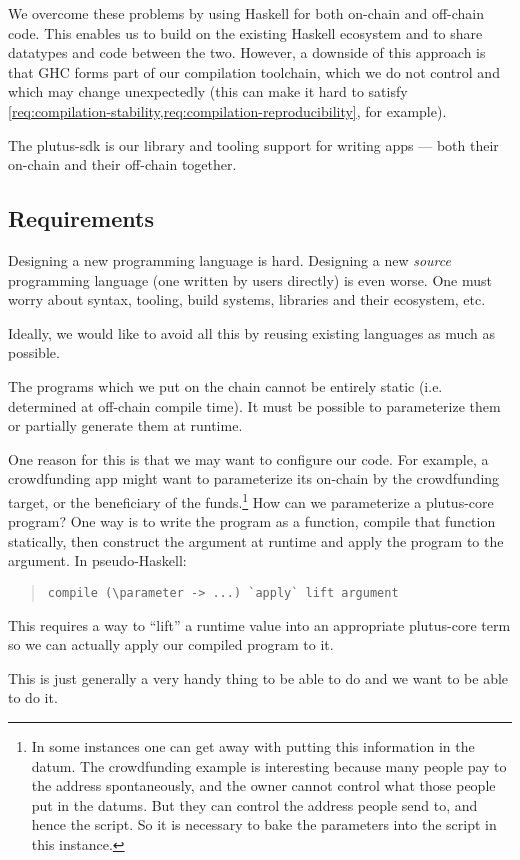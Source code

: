 We overcome these problems by using Haskell for both \gls{on-chain} and \gls{off-chain} code.
This enables us to build on the existing Haskell ecosystem and to share datatypes and code between the two.
However, a downside of this approach is that GHC forms part of our compilation toolchain, which we do not control and which may change unexpectedly (this can make it hard to satisfy \cref{req:compilation-stability,req:compilation-reproducibility}, for example).

The \gls{plutus-sdk} is our library and tooling support for writing \glspl{app} --- both their \gls{on-chain} and their \gls{off-chain} together.

\subsection{Requirements}
\begin{requirement}[Conservatism]
\label{req:source-lang-conservatism}
Designing a new programming language is hard.
Designing a new \emph{source} programming language (one written by users directly) is even worse.
One must worry about syntax, tooling, build systems, libraries and their ecosystem, etc.

Ideally, we would like to avoid all this by reusing existing languages as much as possible.
\end{requirement}

\begin{requirement}
\label{req:runtime-args}
The programs which we put on the chain cannot be entirely static (i.e. determined at \gls{off-chain} compile time).
It must be possible to parameterize them or partially generate them at runtime.

One reason for this is that we may want to configure our code.
For example, a crowdfunding \gls{app} might want to parameterize its \gls{on-chain} by the crowdfunding target, or the beneficiary of the funds.\footnote{
In some instances one can get away with putting this information in the \gls{datum}.
The crowdfunding example is interesting because many people pay to the \gls{address} spontaneously, and the owner cannot control what those people put in the \glspl{datum}.
But they can control the \gls{address} people send to, and hence the \gls{script}.
So it is necessary to bake the parameters into the \gls{script} in this instance.
}
How can we parameterize a \gls{plutus-core} program?
One way is to write the program as a function, compile that function statically, then construct the argument at runtime and apply the program to the argument.
In pseudo-Haskell:
\begin{quote}
\begin{verbatim}
compile (\parameter -> ...) `apply` lift argument
\end{verbatim}
\end{quote}
\noindent This requires a way to ``lift'' a runtime value into an appropriate \gls{plutus-core} term so we can actually apply our compiled program to it.

This is just generally a very handy thing to be able to do and we want to be able to do it.
\end{requirement}

